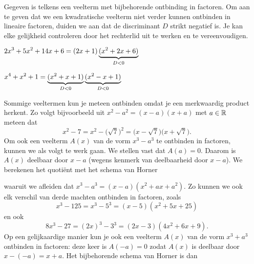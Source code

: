 \documentclass{ximera}
\begin{document}
\begin{example} 
Gegeven is telkens een veelterm met bijbehorende ontbinding in factoren. Om aan te geven dat we een kwadratische veelterm niet verder kunnen ontbinden in lineaire factoren, duiden we aan dat de discriminant $D$ strikt negatief is. Je kan elke gelijkheid controleren door het rechterlid uit te werken en te vereenvoudigen. 

\begin{question} $\displaystyle 2x^3 + 5x^2 + 14x + 6 = (2x+1)\underbrace{(x^2+2x+6)}_{D < 0}$            \end{question}
\begin{question} $\displaystyle x^4+x^2+1 = \underbrace{(x^2+x+1)}_{D < 0}\underbrace{(x^2-x+1)}_{D < 0}$ \end{question}

\end{example} 



Sommige veeltermen kun je meteen ontbinden omdat je een merkwaardig product herkent. Zo volgt bijvoorbeeld uit $x^2 - a^2 = (x-a)(x+a)$ met $a \in \mathbb{R}$ meteen dat
\[
x^2 - 7 = x^2 - \bigl(\sqrt{7}\bigr)^2 = \bigl(x-\sqrt{7})(x+\sqrt{7}\bigr). 
\]
Om ook een veelterm $A(x)$ van de vorm $x^3 - a^3$ te ontbinden in factoren, kunnen we als volgt te werk gaan.
We stellen vast dat $A(a) = 0$. Daarom is $A(x)$ deelbaar door $x-a$ (wegens kenmerk van deelbaarheid door $x-a$). We berekenen het quotiënt met het schema van Horner
\renewcommand{\kolbreed}{\widthof{$-a^3$}}


waaruit we afleiden dat $x^3 - a^3 = (x-a)(x^2 + ax + a^2)$. Zo kunnen we ook elk verschil van derde machten ontbinden in factoren, zoals
\[
x^3 - 125 = x^3 - 5^3 = (x-5)(x^2 + 5x + 25) 
\]
en ook
\[
8x^3 - 27 = (2x)^3 - 3^3 = (2x-3)(4x^2+6x+9).
\]
Op een gelijkaardige manier kun je ook een veelterm $A(x)$ van de vorm $x^3 + a^3$ ontbinden in factoren: deze keer is $A(-a) = 0$ zodat $A(x)$ is deelbaar door $x-(-a) = x+a$. Het bijbehorende schema van Horner is dan
\renewcommand{\kolbreed}{\widthof{$-a^3$}}

\end{document}
